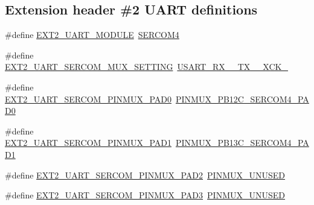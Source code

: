 \subsection*{Extension header \#2 U\+A\+RT definitions}
\begin{DoxyCompactItemize}
\item 
\#define \mbox{\hyperlink{group__samd21__xplained__pro__features__group_gadb664e595fbdde6e3c1a11a238dc3841}{E\+X\+T2\+\_\+\+U\+A\+R\+T\+\_\+\+M\+O\+D\+U\+LE}}~\mbox{\hyperlink{group___s_a_m_d21_j18_a__base_gad48343faa88820b8f552aa1eaf66f00a}{S\+E\+R\+C\+O\+M4}}
\item 
\#define \mbox{\hyperlink{group__samd21__xplained__pro__features__group_gabc611f94ac99344209927a3e6572b29c}{E\+X\+T2\+\_\+\+U\+A\+R\+T\+\_\+\+S\+E\+R\+C\+O\+M\+\_\+\+M\+U\+X\+\_\+\+S\+E\+T\+T\+I\+NG}}~\mbox{\hyperlink{group__asfdoc__sam0__sercom__usart__group_gga87bbdb9f7edb3f1866aeb498bf7c9077ac937b1e1063cc3d094c4534c022af703}{U\+S\+A\+R\+T\+\_\+\+R\+X\+\_\+\_\+\+T\+X\+\_\+\_\+\+X\+C\+K\+\_}}
\item 
\#define \mbox{\hyperlink{group__samd21__xplained__pro__features__group_gaaa9974098a22d4acd21b63a5b19bf06e}{E\+X\+T2\+\_\+\+U\+A\+R\+T\+\_\+\+S\+E\+R\+C\+O\+M\+\_\+\+P\+I\+N\+M\+U\+X\+\_\+\+P\+A\+D0}}~\mbox{\hyperlink{pio_2samd21j18a_8h_a9d189ddf3a65a9ce8806f271b64ff0cd}{P\+I\+N\+M\+U\+X\+\_\+\+P\+B12\+C\+\_\+\+S\+E\+R\+C\+O\+M4\+\_\+\+P\+A\+D0}}
\item 
\#define \mbox{\hyperlink{group__samd21__xplained__pro__features__group_ga8ed7752fb315ddf974e874e1815ccb9a}{E\+X\+T2\+\_\+\+U\+A\+R\+T\+\_\+\+S\+E\+R\+C\+O\+M\+\_\+\+P\+I\+N\+M\+U\+X\+\_\+\+P\+A\+D1}}~\mbox{\hyperlink{pio_2samd21j18a_8h_aa2da90ad4d270e094e4787d0038258df}{P\+I\+N\+M\+U\+X\+\_\+\+P\+B13\+C\+\_\+\+S\+E\+R\+C\+O\+M4\+\_\+\+P\+A\+D1}}
\item 
\#define \mbox{\hyperlink{group__samd21__xplained__pro__features__group_ga78d4c7cb399b582d447aa8b7521ccd9a}{E\+X\+T2\+\_\+\+U\+A\+R\+T\+\_\+\+S\+E\+R\+C\+O\+M\+\_\+\+P\+I\+N\+M\+U\+X\+\_\+\+P\+A\+D2}}~\mbox{\hyperlink{group__asfdoc__sam0__sercom__usart__group_gaffde9ff712058ef836127e1f3368889e}{P\+I\+N\+M\+U\+X\+\_\+\+U\+N\+U\+S\+ED}}
\item 
\#define \mbox{\hyperlink{group__samd21__xplained__pro__features__group_ga1618f9d133e1edfc216fb556101a37e6}{E\+X\+T2\+\_\+\+U\+A\+R\+T\+\_\+\+S\+E\+R\+C\+O\+M\+\_\+\+P\+I\+N\+M\+U\+X\+\_\+\+P\+A\+D3}}~\mbox{\hyperlink{group__asfdoc__sam0__sercom__usart__group_gaffde9ff712058ef836127e1f3368889e}{P\+I\+N\+M\+U\+X\+\_\+\+U\+N\+U\+S\+ED}}

\end{DoxyCompactItemize}
